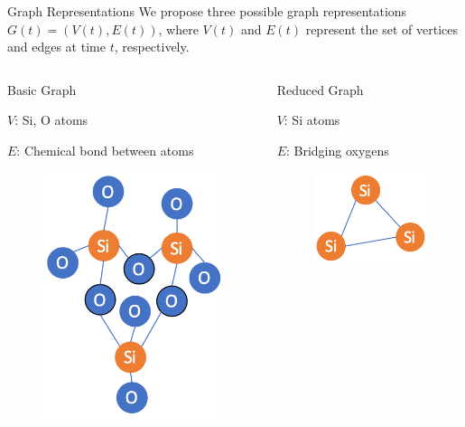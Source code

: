 \begin{frame}[t]{Graph Representations}
We propose three possible graph representations $G(t)=(V(t),E(t))$, where
$V(t)$ and $E(t)$ represent the set of vertices and edges at time $t$, respectively.

 \begin{columns}[t]
 
   \begin{block}{Basic Graph}
   \begin{itemize}
   \begin{footnotesize}
       \item $V$: Si, O atoms
       \item $E$: Chemical bond between atoms
    \end{footnotesize}
    \end{itemize}
    \begin{figure}
	    \centering
        \includegraphics[width=.5\textwidth]{images/basic.png}
	\end{figure}
   \end{block}
   
   \begin{block}{Reduced Graph}
   \begin{itemize}
   \begin{footnotesize}
       \item $V$: Si atoms
       \item $E$: Bridging oxygens
    \end{footnotesize}
   \end{itemize}
    \begin{figure}
	    \centering
        \includegraphics[width=.5\textwidth]{images/reduced.png}
	\end{figure}
   \end{block}
   

\end{columns}
\end{frame}
